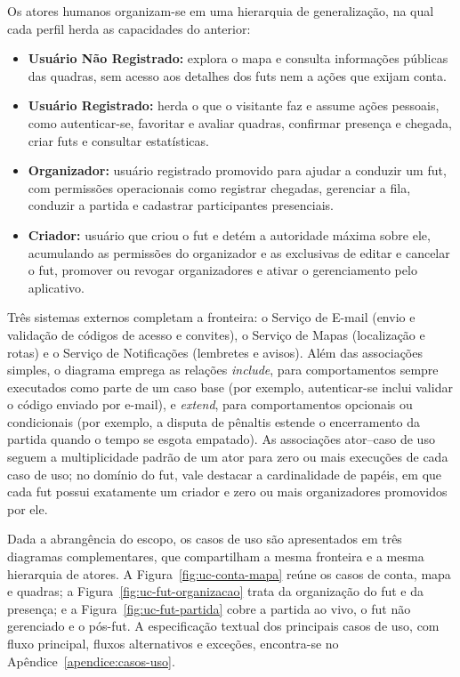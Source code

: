       Os atores humanos organizam-se em uma hierarquia de generalização, na qual cada perfil herda as capacidades do anterior:

      \begin{itemize}
          \item \textbf{Usuário Não Registrado:} explora o mapa e consulta informações públicas das quadras, sem acesso aos detalhes dos futs nem a ações que exijam conta.

          \item \textbf{Usuário Registrado:} herda o que o visitante faz e assume ações pessoais, como autenticar-se, favoritar e avaliar quadras, confirmar presença e chegada, criar futs e consultar estatísticas.

          \item \textbf{Organizador:} usuário registrado promovido para ajudar a conduzir um fut, com permissões operacionais como registrar chegadas, gerenciar a fila, conduzir a partida e cadastrar participantes presenciais.

          \item \textbf{Criador:} usuário que criou o fut e detém a autoridade máxima sobre ele, acumulando as permissões do organizador e as exclusivas de editar e cancelar o fut, promover ou revogar organizadores e ativar o gerenciamento pelo aplicativo.
      \end{itemize}

      Três sistemas externos completam a fronteira: o Serviço de E-mail (envio e validação de códigos de acesso e convites), o Serviço de Mapas (localização e rotas) e o Serviço de Notificações (lembretes e avisos). Além das associações simples, o diagrama emprega as relações \textit{include}, para comportamentos sempre executados como parte de um caso base (por exemplo, autenticar-se inclui validar o código enviado por e-mail), e \textit{extend}, para comportamentos opcionais ou condicionais (por exemplo, a disputa de pênaltis estende o encerramento da partida quando o tempo se esgota empatado). As associações ator–caso de uso seguem a multiplicidade padrão de um ator para zero ou mais execuções de cada caso de uso; no domínio do fut, vale destacar a cardinalidade de papéis, em que cada fut possui exatamente um criador e zero ou mais organizadores promovidos por ele.

      Dada a abrangência do escopo, os casos de uso são apresentados em três diagramas complementares, que compartilham a mesma fronteira e a mesma hierarquia de atores. A Figura~\ref{fig:uc-conta-mapa} reúne os casos de conta, mapa e quadras; a Figura~\ref{fig:uc-fut-organizacao} trata da organização do fut e da presença; e a Figura~\ref{fig:uc-fut-partida} cobre a partida ao vivo, o fut não gerenciado e o pós-fut. A especificação textual dos principais casos de uso, com fluxo principal, fluxos alternativos e exceções, encontra-se no Apêndice~\ref{apendice:casos-uso}.

